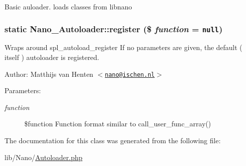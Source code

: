 Basic auloader. loads classes from libnano \hypertarget{classNano__Autoloader_0406e0b6151b72f03e5b215e2cc63c6a}{
\subsubsection[{register}]{\setlength{\rightskip}{0pt plus 5cm}static Nano\_\-Autoloader::register (\$ {\em function} = {\tt null})}}
\label{classNano__Autoloader_0406e0b6151b72f03e5b215e2cc63c6a}


Wraps around spl\_\-autoload\_\-register If no parameters are given, the default ( itself ) autoloader is registered.

\begin{Desc}
\item[Author:]Matthijs van Henten $<$\href{mailto:nano@ischen.nl}{\tt nano@ischen.nl}$>$ \end{Desc}
\begin{Desc}
\item[Parameters:]
\begin{description}
\item[{\em function}]\$function Function format similar to call\_\-user\_\-func\_\-array() \end{description}
\end{Desc}


The documentation for this class was generated from the following file:\begin{CompactItemize}
\item 
lib/Nano/\hyperlink{Autoloader_8php}{Autoloader.php}\end{CompactItemize}
